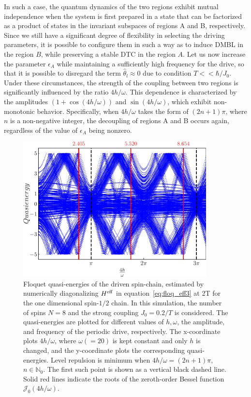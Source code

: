 \documentclass[12pt]{iopart}
\begin{document}
In such a case, the quantum dynamics of the two regions exhibit mutual independence when the system is first prepared in a state that can be factorized as a product of states in the invariant subspaces of regions A and B, respectively. Since we still have a significant degree of flexibility in selecting the driving parameters, it is possible to configure them in such a way as to induce DMBL in the region $B$, while preserving a stable DTC in the region $A$. Let us now increase the parameter $\epsilon_A$ while maintaining a sufficiently high frequency for the drive, so that it is possible to disregard the term $\hat{\theta}_l \approx 0$ due to condition $T<<\hbar/J_0$. Under these circumstances, the strength of the coupling between two regions is significantly influenced by the ratio $4h/\omega$. This dependence is characterized by the amplitudes $(1+\cos(4h/\omega))$ and $\sin(4h/\omega)$, which exhibit non-monotonic behavior. Specifically, when $4h/\omega$ takes the form of $(2n+1)\pi$, where $n$ is a non-negative integer, the decoupling of regions A and B occurs again, regardless of the value of $\epsilon_A$ being nonzero.
\begin{figure}[h!]
    \centering
    \includegraphics[width=10cm]{figure3.pdf}
    \caption{Floquet quasi-energies of the driven spin-chain,  estimated by numerically diagonalizing $H^{\rm eff}$ in equation~\eqref{eq:floq_eff3} at 2T for the one dimensional spin-$1/2$ chain. In this simulation, the number of spins $N=8$ and the strong coupling $J_0=0.2/T$ is considered. The quasi-energies are plotted for different values of $h,\omega$, the amplitude, and frequency of the periodic drive, respectively.  The x-coordinate plots ${4h}/{\omega}$, where $\omega( = 20)$ is kept constant and only $h$ is changed, and the y-coordinate plots the corresponding quasi-energies. Level repulsion is minimum when ${4h}/{\omega} = (2n+1)\pi$, $n\in \mathbb{N}_0$. The first such point is shown as a vertical black dashed line. Solid red lines indicate the roots of the zeroth-order Bessel function $\mathcal{J}_0(4h/\omega)$.}
    \label{Fig:quasienergy_new}
\end{figure}	
\end{document}
